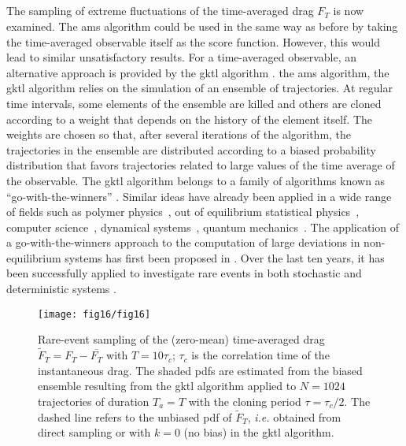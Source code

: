 \subsection{}
\label{sec:gktl}
The sampling of extreme fluctuations of the time-averaged drag $F_T$ is now examined.
The \ac{ams} algorithm could be used in the same way as before by taking the time-averaged observable itself as the score function.
However, this would lead to similar unsatisfactory results.
%
For a time-averaged observable, an alternative approach is provided by the \acf{gktl} algorithm \citep{giardina_direct_2006,tailleur_probing_2007,giardina_simulating_2011}.
%
 the \ac{ams} algorithm, the \ac{gktl} algorithm relies on the simulation of an ensemble of trajectories.
%
At regular time intervals, some elements of the ensemble are killed and others are cloned according to a weight that depends on the history of the element itself.
%
The weights are chosen so that, after several iterations of the algorithm, the trajectories in the ensemble are distributed according to a biased probability distribution that favors trajectories related to large values of the time average of the observable.
%
The \ac{gktl} algorithm belongs to a family of algorithms known as ``go-with-the-winners'' \citep{aldous1994go,grassberger2002go}.
{Similar ideas have already been applied in a wide range of fields such as polymer physics~\citep{grassberger1998perm}, out of equilibrium statistical physics~\citep{PhysRevLett.118.115702}, computer science~\citep{aldous1994go}, dynamical systems~\citep{tailleur_probing_2007}, quantum mechanics~\citep{intro_DMC_kosztin}.}
The application of a go-with-the-winners approach to the computation of large deviations in non-equilibrium systems has first been proposed in \citep{giardina_direct_2006}.
Over the last ten years, it has been successfully applied to investigate rare events in both stochastic \citep{giardina_direct_2006,lecomte_numerical_2007,garrahan2007dynamical} and deterministic systems \citep{giardina_direct_2006,tailleur_probing_2007}.

\begin{figure}
	\centering
	\texttt{[image: fig16/fig16]}
	\caption{\label{fig:IS_GKTL} Rare-event sampling of the (zero-mean) time-averaged drag $\tilde F_T = F_T - \overline{F_T}$ with $T=10\tau_c$; $\tau_c$ is the correlation time of the instantaneous drag. The shaded \ac{pdf}s are estimated from the biased ensemble resulting from the \ac{gktl} algorithm applied to $N=1024$ trajectories of duration $T_a=T$ with the cloning period $\tau=\tau_c/2$.
		The dashed line refers to the unbiased \ac{pdf} of $\tilde F_T$, \textit{i.e.} obtained from direct sampling or with $k=0$ (no bias) in the \ac{gktl} algorithm.
	}
\end{figure}

